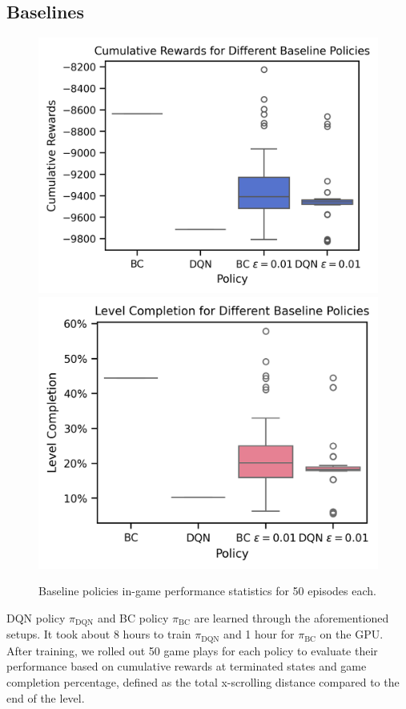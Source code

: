 \documentclass{article}
\begin{document}
\subsection{Baselines}




\begin{figure}[htbp]
      \centering
      \includegraphics[width=0.8\columnwidth]{figures/cum_rewards_baseline.png}
      \vspace{0.5cm} %
      \includegraphics[width=0.8\columnwidth]{figures/completions_baseline.png}
      \caption{Baseline policies in-game performance statistics for 50 episodes each.}
      \label{fig:baseline_policies}
\end{figure}

DQN policy $\pi_{\text{DQN}}$ and BC policy $\pi_{\text{BC}}$ are learned 
through the aforementioned setups. It took about 8 hours to train 
$\pi_{\text{DQN}}$ and 1 hour for $\pi_{\text{BC}}$ on the GPU. After training, 
we rolled out 50 game plays for each policy to evaluate their performance based 
on cumulative rewards at terminated states and game completion percentage, 
defined as the total x-scrolling distance compared to the end of the level. 
\end{document}
